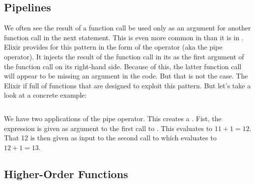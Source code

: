 \subsection{Pipelines}

We often see the result of a function call be used only as an argument for another function call in the next statement. This  is even more common in  than it is in . Elixir provides  for this pattern in the form of the \keywordname{|>} operator (aka the pipe operator). It injects the result of the function call in its  as the first argument of the function call on its right-hand side. Because of this, the latter function call will appear to be missing an argument in the code. But that is not the case. The Elixir  if full of functions that are designed to exploit this pattern. But let's take a look at a concrete example:

\inputminted[firstline=4]{elixir}{../src/elixir/functions/pipelining/pipelining.exs} %

We have two applications of the pipe operator. This creates a . Fist, the expression  is given as argument to the first call to . This evaluates to $11+1=12$. That 12 is then given as input to the second call to  which evaluates to $12+1=13$.

\subsection{Higher-Order Functions}

